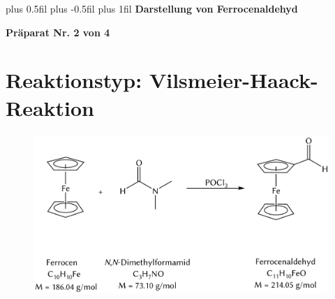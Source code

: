 \documentclass[12pt]{article}
\begin{document}
\begingroup
\leftskip=0cm plus 0.5fil \rightskip=0cm plus -0.5fil
\parfillskip=0cm plus 1fil
 \textbf{\large Darstellung von Ferrocenaldehyd}\par
\endgroup

\begin{center}
 \textbf{Präparat Nr. 2 von 4}
\end{center}
\section{Reaktionstyp: \textnormal{Vilsmeier-Haack-Reaktion} }
\begin{figure}[ht]
\centering
\includegraphics[width=\textwidth]{reaktion.png}
\end{figure}
\end{document}
